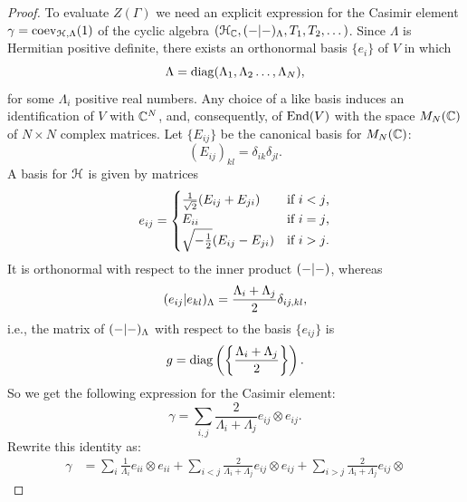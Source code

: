 \begin{proof}
  To evaluate $Z(\Gamma)$ we need an explicit expression for the
  Casimir element $\gamma = \coev_{\Hermitian[N],\Lambda}(1)$ of the cyclic
  algebra $(\Hermitian[N]_\setC, \inner[\Lambda]{-}{-}, T_1, T_2,
  \dots)$.  Since $\Lambda$ is Hermitian positive definite, there
  exists an orthonormal basis $\{e_i\}$ of $V$ in which
  \begin{equation*}
    \Lambda=\diag(\Lambda_1,\Lambda_2\dots,\Lambda_N),
  \end{equation*}
  for some $\Lambda_i$ positive real numbers. Any choice of a like basis
  induces an identification of $V$ with $\setC^N$, and, consequently,
  of $\End(V)$ with the space $M_N(\setC)$ of $N \times N$ complex
  matrices. Let $\{E_{ij}\}$ be the canonical basis for $M_N(\setC)$:
  \begin{equation*}
    (E_{ij})_{kl}=\delta_{ik}\delta_{jl}. 
  \end{equation*}
  A basis for $\Hermitian[N]$ is given by matrices
  \begin{equation*}
    e_{ij}=\begin{cases}
      \frac{1}{\sqrt{2}} (E_{ij}+E_{ji}) &\text{if $i<j$,}\\
      E_{ii}                             &\text{if $i=j$,}\\
      \sqrt{-\onehalf} (E_{ij}-E_{ji})   &\text{if $i>j$.} 
    \end{cases}
  \end{equation*}
  It is orthonormal with respect to the inner product
  $\inner{-}{-}$, whereas 
  \begin{equation*}
    \inner[\Lambda]{e_{ij}}{e_{kl}}
    = \frac{\Lambda_i + \Lambda_j}{2} \delta_{ij,kl},
  \end{equation*}
  i.e., the matrix of $\inner[\Lambda]{-}{-}$ with respect to the
  basis $\{e_{ij}\}$ is
  \begin{equation*}
    g = \diag\left(\left\{ \frac{\Lambda_i + \Lambda_j}{2}
      \right\}\right). 
  \end{equation*}
  So we get the following expression for the Casimir element:
  \begin{equation*}
    \gamma = \sum_{i,j} \frac{2}{\Lambda_i+\Lambda_j} e_{ij} \otimes e_{ij}. 
  \end{equation*}
  Rewrite this identity as:
  \begin{align*}
    \gamma &=\sum_{i}\frac{1}{{\Lambda_i}}e_{ii}\otimes
    e_{ii}+\sum_{i<j}\frac{2}{{\Lambda_i+\Lambda_j}}e_{ij}\otimes
    e_{ij}+\sum_{i>j}\frac{2}{{\Lambda_i+\Lambda_j}}e_{ij}\otimes

\end{align*}
\end{proof}
